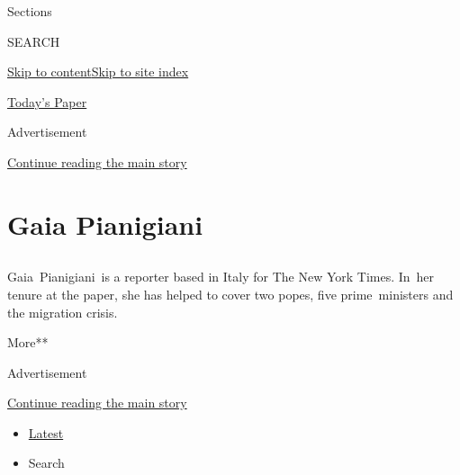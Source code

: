 Sections

SEARCH

\protect\hyperlink{site-content}{Skip to
content}\protect\hyperlink{site-index}{Skip to site index}

\href{https://myaccount.nytimes.com/auth/login?response_type=cookie\&client_id=vi}{}

\href{https://www.nytimes.com/section/todayspaper}{Today's Paper}

Advertisement

\protect\hyperlink{after-top}{Continue reading the main story}

\hypertarget{gaia-pianigiani}{%
\section{Gaia Pianigiani}\label{gaia-pianigiani}}

\subsection{}

Gaia~Pianigiani~is a reporter based in Italy for The New York Times.
In~her tenure at the paper, she has helped to cover two popes, five
prime~ministers and the migration crisis.

More**

Advertisement

\protect\hyperlink{after-mid1}{Continue reading the main story}

\begin{itemize}
\tightlist
\item
  \protect\hyperlink{stream-panel}{Latest}
\item
  Search
\end{itemize}

